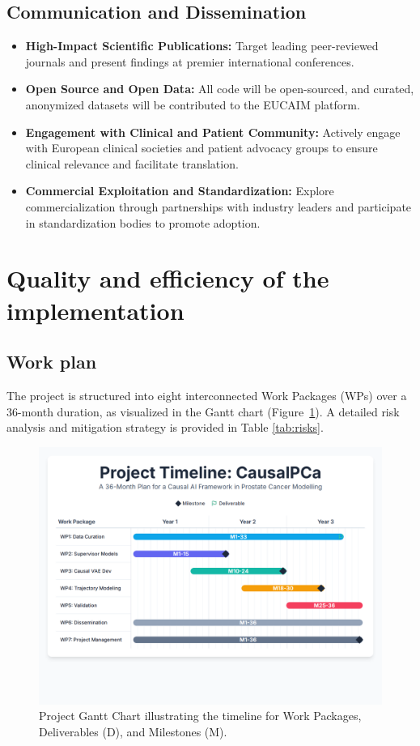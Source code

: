 \documentclass[11pt, a4paper]{article}
\begin{document}
\subsection{Communication and Dissemination}
\begin{itemize}
    \item \textbf{High-Impact Scientific Publications:} Target leading peer-reviewed journals and present findings at premier international conferences.
    \item \textbf{Open Source and Open Data:} All code will be open-sourced, and curated, anonymized datasets will be contributed to the EUCAIM platform.
    \item \textbf{Engagement with Clinical and Patient Community:} Actively engage with European clinical societies and patient advocacy groups to ensure clinical relevance and facilitate translation.
    \item \textbf{Commercial Exploitation and Standardization:} Explore commercialization through partnerships with industry leaders and participate in standardization bodies to promote adoption.
\end{itemize}

\section{Quality and efficiency of the implementation}

\subsection{Work plan}
The project is structured into eight interconnected Work Packages (WPs) over a 36-month duration, as visualized in the Gantt chart (Figure~\ref{fig:gantt}). A detailed risk analysis and mitigation strategy is provided in Table \ref{tab:risks}.

\begin{figure}[H]
    \centering
    \includegraphics[width=\textwidth]{gantt.png}
    \caption{Project Gantt Chart illustrating the timeline for Work Packages, Deliverables (D), and Milestones (M).}
    \label{fig:gantt}
\end{figure}
\end{document}
